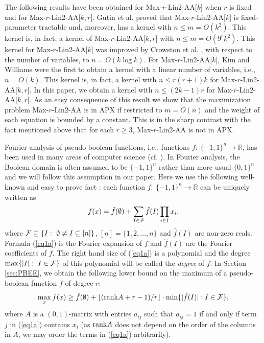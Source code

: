 \documentclass{llncs}
\begin{document}
 The following results have been obtained for {\sc Max-$r$-Lin2-AA}[$k$] when $r$ is fixed and for {\sc Max-$r$-Lin2-AA}[$k,r$]. Gutin et al. \cite{GutKimSzeYeo11} proved that {\sc Max-$r$-Lin2-AA}[$k$] is fixed-parameter tractable and, moreover, has a kernel with $n\le m = O(k^2)$. This kernel is, in fact, a kernel of {\sc Max-$r$-Lin2-AA}[$k,r$] with $n\le m = O(9^rk^2)$. This kernel for {\sc Max-$r$-Lin2-AA}[$k$] was improved by Crowston et al. \cite{CroGutJonKimRuz10}, with respect to the number of variables,  to $n = O(k\log k)$. For {\sc Max-$r$-Lin2-AA}[$k$], Kim and Williams \cite{KimWil} were the first to obtain a kernel with a linear number of variables, i.e., $n = O(k)$. This kernel is, in fact, a kernel with $n\le r(r+1)k$ for  {\sc Max-$r$-Lin2-AA}[$k,r$]. In this paper, we obtain a kernel with $n\le (2k-1)r$ for {\sc Max-$r$-Lin2-AA}[$k,r$]. As an easy consequence of this result we show that the maximization problem {\sc Max-$r$-Lin2-AA} is in APX if restricted to $m=O(n)$ and the weight of each equation is bounded by a constant. This is in the sharp contrast with the fact mentioned above that for each $r\ge 3$, {\sc Max-$r$-Lin2-AA} is not in APX.




Fourier analysis of pseudo-boolean functions, i.e., functions $f:\ \{-1,1\}^n\rightarrow \mathbb{R}$,
has been used in many areas of computer science (cf. \cite{AloGutKimSzeYeo11,CroGutJonKimRuz10,odonn}).
In Fourier analysis, the Boolean domain is often assumed to be $\{-1,1\}^n$ rather than more usual $\{0,1\}^n$
and we will follow this assumption in our paper. Here we use the following well-known and easy to prove fact \cite{odonn}:
each function $f:\ \{-1,1\}^n\rightarrow \mathbb{R}$ can be uniquely written as
\begin{equation}\label{eq1a}f(x)=\hat{f}(\emptyset) + \sum_{I\in {\cal F}}\hat{f}(I)\prod_{i\in I}x_i.\end{equation}
where ${\cal F}\subseteq \{I:\ \emptyset \neq I\subseteq [n]\}$, $[n]=\{1,2,\ldots ,n\}$ and
$\hat{f}(I)$ are non-zero reals. Formula (\ref{eq1a}) is the Fourier expansion of $f$ and $\hat{f}(I)$ are the Fourier coefficients of $f$.
The right hand size of (\ref{eq1a}) is a polynomial and the degree $\max \{|I|:\ I\in {\cal F}\}$ of this polynomial will be called the {\em degree} of $f$.
In Section \ref{sec:PBEE}, we obtain the following lower bound on the maximum of a pseudo-boolean function $f$ of degree $r$:
\begin{equation}\label{LBpb1i}\max_x f(x)\ge \hat{f}(\emptyset) + \lfloor ({\rm rank} A +r -1)/r\rfloor \cdot \min \{|\hat{f}(I)|: I\in {\cal F}\},\end{equation} where $A$ is a $(0,1)$-matrix with entries $a_{ij}$ such that $a_{ij}=1$ if and only if term $j$ in (\ref{eq1a}) contains $x_i$
(as ${\rm rank} A$ does not depend on the order of the columns in $A$, we may order the terms in (\ref{eq1a}) arbitrarily).
\end{document}
